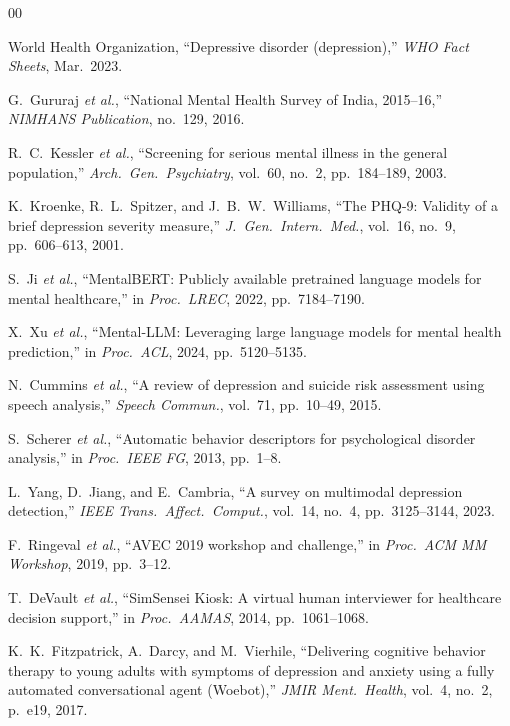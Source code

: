 \documentclass[10pt, conference, letterpaper]{IEEEtran}
\begin{document}
\begin{thebibliography}{00}

World Health Organization, ``Depressive disorder (depression),''
\textit{WHO Fact Sheets}, Mar.\ 2023.

G.~Gururaj \textit{et al.},
``National Mental Health Survey of India, 2015--16,''
\textit{NIMHANS Publication}, no.~129, 2016.

R.~C.~Kessler \textit{et al.},
``Screening for serious mental illness in the general population,''
\textit{Arch.\ Gen.\ Psychiatry}, vol.~60, no.~2, pp.~184--189, 2003.

K.~Kroenke, R.~L.~Spitzer, and J.~B.~W.~Williams,
``The PHQ-9: Validity of a brief depression severity measure,''
\textit{J.\ Gen.\ Intern.\ Med.}, vol.~16, no.~9, pp.~606--613, 2001.

S.~Ji \textit{et al.},
``MentalBERT: Publicly available pretrained language models for mental
healthcare,''
in \textit{Proc.\ LREC}, 2022, pp.~7184--7190.

X.~Xu \textit{et al.},
``Mental-LLM: Leveraging large language models for mental health prediction,''
in \textit{Proc.\ ACL}, 2024, pp.~5120--5135.

N.~Cummins \textit{et al.},
``A review of depression and suicide risk assessment using speech analysis,''
\textit{Speech Commun.}, vol.~71, pp.~10--49, 2015.

S.~Scherer \textit{et al.},
``Automatic behavior descriptors for psychological disorder analysis,''
in \textit{Proc.\ IEEE FG}, 2013, pp.~1--8.

L.~Yang, D.~Jiang, and E.~Cambria,
``A survey on multimodal depression detection,''
\textit{IEEE Trans.\ Affect.\ Comput.}, vol.~14, no.~4,
pp.~3125--3144, 2023.

F.~Ringeval \textit{et al.},
``AVEC 2019 workshop and challenge,''
in \textit{Proc.\ ACM MM Workshop}, 2019, pp.~3--12.

T.~DeVault \textit{et al.},
``SimSensei Kiosk: A virtual human interviewer for healthcare decision
support,''
in \textit{Proc.\ AAMAS}, 2014, pp.~1061--1068.

K.~K.~Fitzpatrick, A.~Darcy, and M.~Vierhile,
``Delivering cognitive behavior therapy to young adults with symptoms of
depression and anxiety using a fully automated conversational agent (Woebot),''
\textit{JMIR Ment.\ Health}, vol.~4, no.~2, p.~e19, 2017.


\end{thebibliography}
\end{document}

